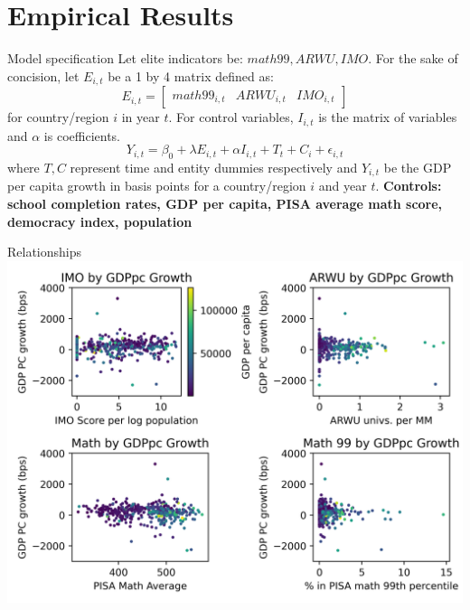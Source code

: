 \documentclass[10pt]{beamer}
\begin{document}
\section{Empirical Results}
\begin{frame}{Model specification}
    \small
    Let elite indicators be: $math99, ARWU, IMO$.
    For the sake of concision, let $E_{i,t}$ be a 1 by 4 matrix defined as:
    \[E_{i,t} = 
    \begin{bmatrix}
        math99_{i, t} & ARWU_{i, t} & IMO_{i, t}
    \end{bmatrix}
    \] for country/region $i$ in year $t$.
    For control variables, $I_{i, t}$ is the matrix of variables and $\alpha$ is coefficients.
    \begin{equation}
        Y_{i, t} = \beta_0 + \lambda E_{i, t} + \alpha I_{i, t} + T_t + C_i + \epsilon_{i, t}
    \end{equation}
    where $T,C$ represent time and entity dummies respectively and $Y_{i,t}$ be the GDP per capita growth in basis points for a country/region $i$ and year $t$.
    \textbf{Controls: school completion rates, GDP per capita, PISA average math score, democracy index, population}
\end{frame}

\begin{frame}{Relationships}
    \centering
    \includegraphics[width=\textwidth]{../charts/relationships.png}
\end{frame}
\end{document}
